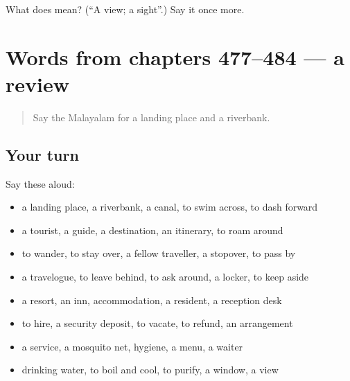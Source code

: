 \begin{tcolorbox}[breakable,colback=teal!4,colframe=teal!35!black,title={Before you move on}]
What does  mean? (\textquotedblleft{}A view; a sight\textquotedblright{}.) Say it once more.
\end{tcolorbox}
\section[(dialogue)]{Words from chapters 477–484 — a review}

\label{lesson:ML-R484-review-477-484}



\begin{quote}
Say the Malayalam for a landing place and a riverbank.
\end{quote}

\subsection*{Your turn}
Say these aloud:

\begin{itemize}
\raggedright
  \item a landing place, a riverbank, a canal, to swim across, to dash forward
  \item a tourist, a guide, a destination, an itinerary, to roam around
  \item to wander, to stay over, a fellow traveller, a stopover, to pass by
  \item a travelogue, to leave behind, to ask around, a locker, to keep aside
  \item a resort, an inn, accommodation, a resident, a reception desk
  \item to hire, a security deposit, to vacate, to refund, an arrangement
  \item a service, a mosquito net, hygiene, a menu, a waiter
  \item drinking water, to boil and cool, to purify, a window, a view
\end{itemize}

